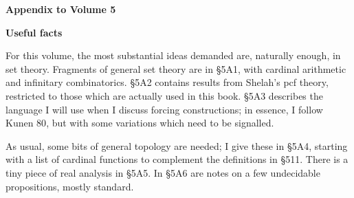       
\def\chaptername{Appendix} 
\def\sectionname{Introduction} 
      
\gdef\topparagraph{} 
\gdef\bottomparagraph{Appendix to Vol.\ 5 {\it intro.}} 
      
\centerline{\bf Appendix to Volume 5} 
      
\medskip 
      
\centerline{\bf Useful facts} 
      
\medskip 
      
For this volume, the most substantial ideas demanded are, 
naturally enough, in
set theory.   Fragments of general set theory are in \S5A1, with cardinal
arithmetic and infinitary combinatorics.
\S5A2 contains results from Shelah's pcf theory,
restricted to those which are actually used in this book.   \S5A3
describes the language I will use when I discuss forcing constructions;
in essence, I follow {\smc Kunen 80}, but with some variations which need
to be signalled.   

As usual, some bits of general topology are needed;   I give these in
\S5A4, starting with a list of cardinal functions to complement the
definitions in \S511.   There is a tiny piece of real analysis in \S5A5.
In \S5A6 are notes on a few undecidable propositions, mostly standard.   

\discrpage 
      
      
